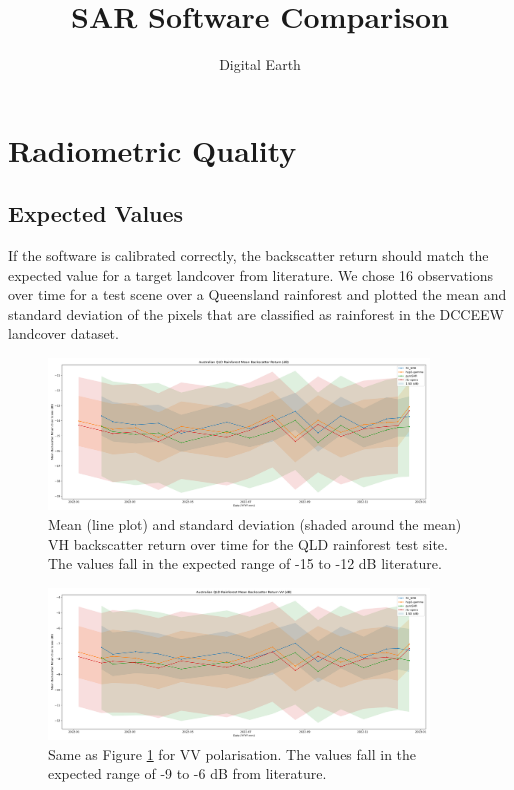 \documentclass{article}
\title{SAR Software Comparison}
\author{Digital Earth}
\begin{document}
\maketitle

\section{Radiometric Quality}
\subsection{Expected Values}
If the software is calibrated correctly, the backscatter return should match the expected value for a target landcover from literature. We chose 16 observations over time for a test scene over a Queensland rainforest and plotted the mean and standard deviation of the pixels that are classified as rainforest in the DCCEEW landcover dataset.

\begin{figure}[ht]
\centering
\includegraphics[width=0.9\textwidth]{rainforest_return.png}
\caption{\label{fig:rainforestvh} Mean (line plot) and standard deviation (shaded around the mean) VH backscatter return over time for the QLD rainforest test site. The values fall in the expected range of -15 to -12 dB literature.}
\end{figure}

\begin{figure}[ht]
\centering
\includegraphics[width=0.9\textwidth]{rainforest_return_VV.png}
\caption{\label{fig:rainforestvv} Same as Figure \ref{fig:rainforestvh} for VV polarisation. The values fall in the expected range of -9 to -6 dB from literature.}
\end{figure}
\end{document}
